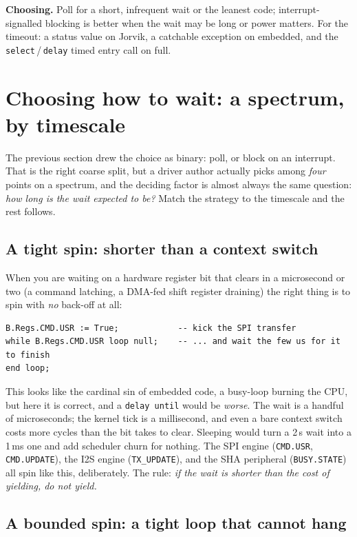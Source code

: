 \textbf{Choosing.} Poll for a short, infrequent wait or the leanest code;
interrupt-signalled blocking is better when the wait may be long or power matters.
For the timeout: a status value on Jorvik, a catchable exception on embedded, and
the \texttt{select}\,/\,\texttt{delay} timed entry call on full.

\section{Choosing how to wait: a spectrum, by timescale}
\label{sec:wait-spectrum}

The previous section drew the choice as binary: poll, or block on an interrupt.
That is the right coarse split, but a driver author actually picks among
\emph{four} points on a spectrum, and the deciding factor is almost always the
same question: \emph{how long is the wait expected to be?} Match the strategy to
the timescale and the rest follows.

\subsection{A tight spin: shorter than a context switch}

When you are waiting on a hardware register bit that clears in a microsecond or
two (a command latching, a DMA-fed shift register draining) the right thing
is to spin with \emph{no} back-off at all:

\begin{lstlisting}
B.Regs.CMD.USR := True;            -- kick the SPI transfer
while B.Regs.CMD.USR loop null;    -- ... and wait the few us for it to finish
end loop;
\end{lstlisting}

This looks like the cardinal sin of embedded code, a busy-loop burning the CPU,
but here it is correct, and a \texttt{delay until} would be \emph{worse}. The
wait is a handful of microseconds; the kernel tick is a millisecond, and even a
bare context switch costs more cycles than the bit takes to clear. Sleeping would
turn a 2\,\textmu s wait into a 1\,ms one and add scheduler churn for nothing. The
SPI engine (\texttt{CMD.USR}, \texttt{CMD.UPDATE}), the I2S engine
(\texttt{TX\_UPDATE}), and the SHA peripheral (\texttt{BUSY.STATE}) all spin like
this, deliberately. The rule: \emph{if the wait is shorter than the cost of
yielding, do not yield.}

\subsection{A bounded spin: a tight loop that cannot hang}

